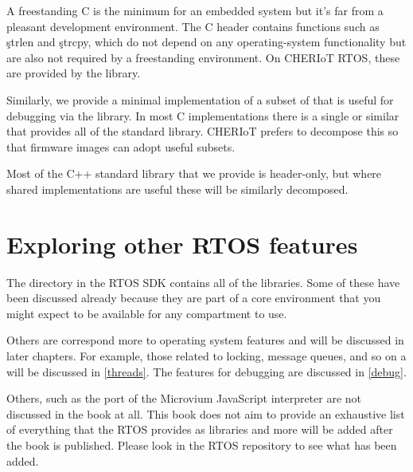 A freestanding C is the minimum for an embedded system but it's far from a pleasant development environment.
The C  header contains functions such as \c{strlen} and \c{strcpy}, which do not depend on any operating-system functionality but are also not required by a freestanding environment.
On CHERIoT RTOS, these are provided by the  library.

Similarly, we provide a minimal implementation of a subset of  that is useful for debugging via the  library.
In most C implementations there is a single  or similar that provides all of the standard library.
CHERIoT prefers to decompose this so that firmware images can adopt useful subsets.

Most of the C++ standard library that we provide is header-only, but where shared implementations are useful these will be similarly decomposed.

\section{Exploring other RTOS features}

The  directory in the RTOS SDK contains all of the libraries.
Some of these have been discussed already because they are part of a core environment that you might expect to be available for any compartment to use.

Others are correspond more to operating system features and will be discussed in later chapters.
For example, those related to locking, message queues, and so on a will be discussed in \ref{threads}.
The features for debugging are discussed in \ref{debug}.

Others, such as the port of the Microvium JavaScript interpreter are not discussed in the book at all.
This book does not aim to provide an exhaustive list of everything that the RTOS provides as libraries and more will be added after the book is published.
Please look in the RTOS repository to see what has been added.
